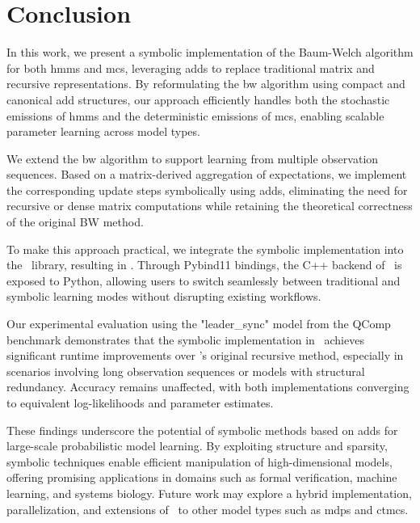 \section{Conclusion}\label{sec:conclusion}
In this work, we present a symbolic implementation of the Baum-Welch algorithm for both \glspl{hmm} and \glspl{mc}, leveraging \glspl{add} to replace traditional matrix and recursive representations.
By reformulating the \gls{bw} algorithm using compact and canonical \gls{add} structures, our approach efficiently handles both the stochastic emissions of \glspl{hmm} and the deterministic emissions of \glspl{mc}, enabling scalable parameter learning across model types.

We extend the \gls{bw} algorithm to support learning from multiple observation sequences.
Based on a matrix-derived aggregation of expectations, we implement the corresponding update steps symbolically using \glspl{add}, eliminating the need for recursive or dense matrix computations while retaining the theoretical correctness of the original BW method.

To make this approach practical, we integrate the symbolic implementation into the \Jajapy\ library, resulting in \JajapyTwo. Through Pybind11 bindings, the C++ backend of \Cupaal\ is exposed to Python, allowing users to switch seamlessly between traditional and symbolic learning modes without disrupting existing workflows.

Our experimental evaluation using the "leader\_sync" model from the QComp benchmark demonstrates that the symbolic implementation in \Cupaal\ achieves significant runtime improvements over \Jajapy's original recursive method, especially in scenarios involving long observation sequences or models with structural redundancy.
Accuracy remains unaffected, with both implementations converging to equivalent log-likelihoods and parameter estimates.

These findings underscore the potential of symbolic methods based on \glspl{add} for large-scale probabilistic model learning.
By exploiting structure and sparsity, symbolic techniques enable efficient manipulation of high-dimensional models, offering promising applications in domains such as formal verification, machine learning, and systems biology.
Future work may explore a hybrid implementation, parallelization, and extensions of \Cupaal\ to other model types such as \glspl{mdp} and \glspl{ctmc}.


